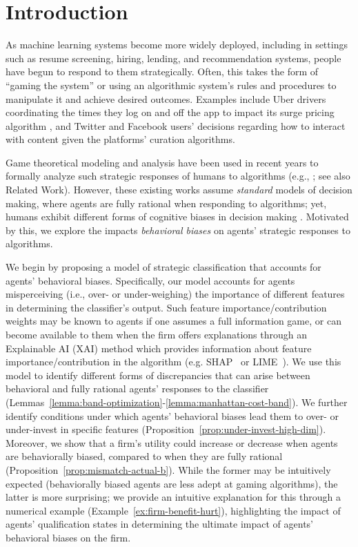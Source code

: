 \section{Introduction}

As machine learning systems become more widely deployed, including in settings such as resume screening, hiring, lending, and recommendation systems, people have begun to respond to them strategically. Often, this takes the form of ``gaming the system'' or using an algorithmic system's rules and procedures to manipulate it and achieve desired outcomes. Examples include Uber drivers coordinating the times they log on and off the app to impact its surge pricing algorithm \cite{mohlmann2017hands}, and Twitter \cite{burrell2019users} and Facebook \cite{eslami2016first} users' decisions regarding how to interact with content given the platforms' curation algorithms. 

Game theoretical modeling and analysis have been used in recent years to formally analyze such strategic responses of humans to algorithms (e.g., \cite{Hardt2016strategic, Milli2019socialcost, Liu2020disparateequilibria}; see also Related Work). However, these existing works assume \emph{standard} models of decision making, where agents are fully rational when responding to algorithms; yet, humans exhibit different forms of cognitive biases in decision making \cite{kahnemann1979prospect}. Motivated by this, we explore the impacts \emph{behavioral biases} on agents' strategic responses to algorithms. 

We begin by proposing a model of strategic classification that accounts for agents' behavioral biases. Specifically, our model accounts for agents misperceiving (i.e., over- or under-weighing) the importance of different features in determining the classifier's output. Such feature importance/contribution weights may be known to agents if one assumes a full information game, or can become available to them when the firm offers explanations through an Explainable AI (XAI) method which provides information about feature importance/contribution in the algorithm (e.g. SHAP~\cite{lundberg2017shap} or LIME~\cite{ribeiro2016lime}). We use this model to identify different forms of discrepancies that can arise between behavioral and fully rational agents' responses to the classifier (Lemmas~\ref{lemma:band-optimization}-\ref{lemma:manhattan-cost-band}). We further identify conditions under which agents' behavioral biases lead them to over- or under-invest in specific features (Proposition~\ref{prop:under-invest-high-dim}). Moreover, we show that a firm's utility could increase or decrease when agents are behaviorally biased, compared to when they are fully rational (Proposition~\ref{prop:mismatch-actual-b}). While the former may be intuitively expected (behaviorally biased agents are less adept at gaming algorithms), the latter is more surprising; we  provide an intuitive explanation for this through a numerical example (Example~\ref{ex:firm-benefit-hurt}), highlighting the impact of agents' qualification states in determining the ultimate impact of agents' behavioral biases on the firm. 


